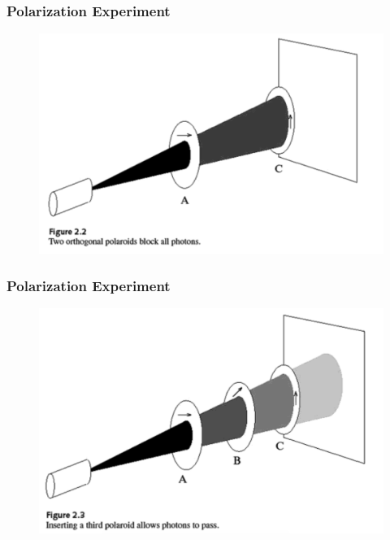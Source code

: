 \documentclass{beamer}
\begin{document}
\begin{frame}
\frametitle{Polarization Experiment}
\begin{figure}
\centering
\includegraphics[width=\textwidth]{polar2.png}
\label{polar2}
\end{figure}
\end{frame}

\begin{frame}
\frametitle{Polarization Experiment}
\begin{figure}
\centering
\includegraphics[width=\textwidth]{polar3.png}
\label{polar3}
\end{figure}
\end{frame}
\end{document}
